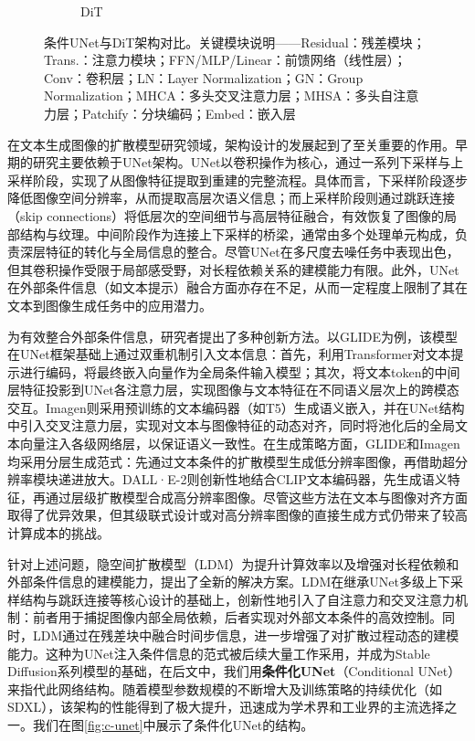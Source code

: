 \documentclass[11pt,a4paper,UTF8]{ctexart}
\begin{document}
\begin{figure}[htbp]
\begin{subfigure}[b]{0.52\textwidth}
        \caption{DiT}
        \label{fig:dit}
    \end{subfigure}
    \caption{条件UNet与DiT架构对比。关键模块说明——Residual：残差模块；Trans.：注意力模块；FFN/MLP/Linear：前馈网络（线性层）；Conv：卷积层；LN：Layer Normalization；GN：Group Normalization；MHCA：多头交叉注意力层；MHSA：多头自注意力层；Patchify：分块编码；Embed：嵌入层}
    \label{fig:cunet-dit}
\end{figure}

在文本生成图像的扩散模型研究领域，架构设计的发展起到了至关重要的作用。早期的研究\cite{song2019generative,ho2020denoising}主要依赖于UNet架构\cite{ronneberger2015u}。UNet以卷积操作为核心，通过一系列下采样与上采样阶段，实现了从图像特征提取到重建的完整流程。具体而言，下采样阶段逐步降低图像空间分辨率，从而提取高层次语义信息；而上采样阶段则通过跳跃连接（skip connections）将低层次的空间细节与高层特征融合，有效恢复了图像的局部结构与纹理。中间阶段作为连接上下采样的桥梁，通常由多个处理单元构成，负责深层特征的转化与全局信息的整合。尽管UNet在多尺度去噪任务中表现出色，但其卷积操作受限于局部感受野，对长程依赖关系的建模能力有限。此外，UNet在外部条件信息（如文本提示）融合方面亦存在不足，从而一定程度上限制了其在文本到图像生成任务中的应用潜力。

为有效整合外部条件信息，研究者提出了多种创新方法。以GLIDE\cite{pmlr-v162-nichol22a}为例，该模型在UNet框架基础上通过双重机制引入文本信息：首先，利用Transformer对文本提示进行编码，将最终嵌入向量作为全局条件输入模型；其次，将文本token的中间层特征投影到UNet各注意力层，实现图像与文本特征在不同语义层次上的跨模态交互。Imagen\cite{saharia2022photorealistic}则采用预训练的文本编码器（如T5\cite{raffel2020exploring}）生成语义嵌入，并在UNet结构中引入交叉注意力层，实现对文本与图像特征的动态对齐，同时将池化后的全局文本向量注入各级网络层，以保证语义一致性。在生成策略方面，GLIDE和Imagen均采用分层生成范式：先通过文本条件的扩散模型生成低分辨率图像，再借助超分辨率模块递进放大。DALL·E-2\cite{ramesh2022hierarchical}则创新性地结合CLIP文本编码器，先生成语义特征，再通过层级扩散模型合成高分辨率图像。尽管这些方法在文本与图像对齐方面取得了优异效果，但其级联式设计或对高分辨率图像的直接生成方式仍带来了较高计算成本的挑战。

针对上述问题，隐空间扩散模型（LDM）\cite{rombach2022high}为提升计算效率以及增强对长程依赖和外部条件信息的建模能力，提出了全新的解决方案。LDM在继承UNet多级上下采样结构与跳跃连接等核心设计的基础上，创新性地引入了自注意力和交叉注意力机制：前者用于捕捉图像内部全局依赖，后者实现对外部文本条件的高效控制。同时，LDM通过在残差块中融合时间步信息，进一步增强了对扩散过程动态的建模能力。这种为UNet注入条件信息的范式被后续大量工作采用，并成为Stable Diffusion系列模型的基础，在后文中，我们用\textbf{条件化UNet}（Conditional UNet）来指代此网络结构。随着模型参数规模的不断增大及训练策略的持续优化（如SDXL\cite{podell2023sdxl}），该架构的性能得到了极大提升，迅速成为学术界和工业界的主流选择之一。我们在图\ref{fig:c-unet}中展示了条件化UNet的结构。
\end{document}
